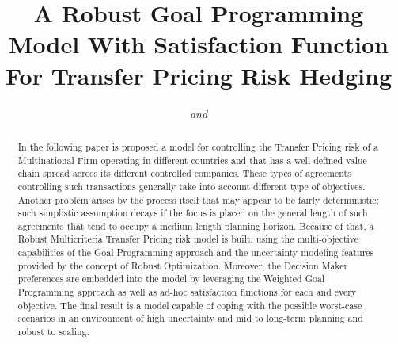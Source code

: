 \documentclass[conference,final,]{IEEEtran}
\begin{document}
\title{A Robust Goal Programming Model With Satisfaction Function For Transfer Pricing Risk Hedging}

\author{
\and
{}
\textit{and}\\
\and
{}
}

\maketitle

\begin{abstract}
  In the following paper is proposed a model for controlling the Transfer Pricing risk of a Multinational Firm operating in different countries and that has a well-defined value chain spread across its different controlled companies. These types of agreements controlling such transactions generally take into account different type of objectives. Another problem arises by the process itself that may appear to be fairly deterministic; such simplistic assumption decays if the focus is placed on the general length of such agreements that tend to occupy a medium length planning horizon. Because of that, a Robust Multicriteria Transfer Pricing risk model is built, using the multi-objective capabilities of the Goal Programming approach and the uncertainty modeling features provided by the concept of Robust Optimization. Moreover, the Decision Maker preferences are embedded into the model by leveraging the Weighted Goal Programming approach as well as ad-hoc satisfaction functions for each and every objective. The final result is a model capable of coping with the possible worst-case scenarios in an environment of high uncertainty and mid to long-term planning and robust to scaling.
\end{abstract}
\end{document}
